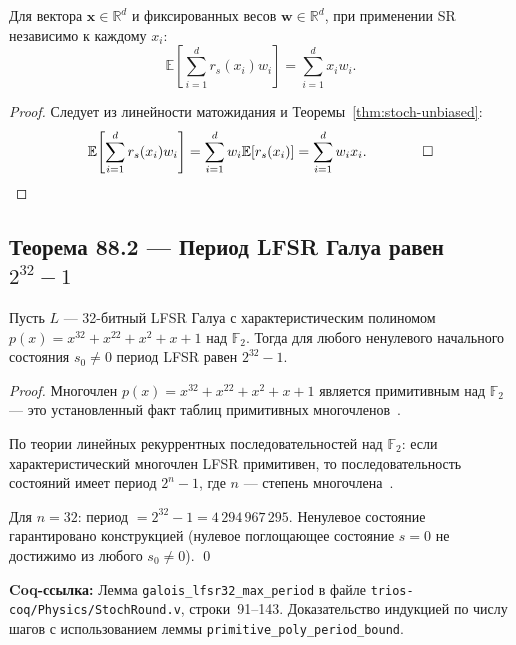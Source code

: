 \begin{corollary}
\label{cor:mac-unbiased}
Для вектора $\mathbf{x} \in \mathbb{R}^d$ и фиксированных весов
$\mathbf{w} \in \mathbb{R}^d$, при применении SR независимо к
каждому $x_i$:
\[
  \mathbb{E}\!\left[\sum_{i=1}^d r_s(x_i) w_i\right] = \sum_{i=1}^d x_i w_i.
\]
\end{corollary}

\begin{proof}
Следует из линейности матожидания и Теоремы~\ref{thm:stoch-unbiased}:
\[
  \mathbb{E}\!\left[\sum_{i=1}^d r_s(x_i) w_i\right]
  = \sum_{i=1}^d w_i \mathbb{E}[r_s(x_i)] = \sum_{i=1}^d w_i x_i. \qquad \qed
\]
\end{proof}

\subsection{Теорема 88.2 — Период LFSR Галуа равен $2^{32}-1$}
\label{ssec:glava88-thm2}

\begin{theorem}
\label{thm:lfsr-period}
Пусть $L$ — 32-битный LFSR Галуа с характеристическим полиномом
$p(x) = x^{32} + x^{22} + x^2 + x + 1$ над $\mathbb{F}_2$.
Тогда для любого ненулевого начального состояния $s_0 \neq 0$
период LFSR равен $2^{32} - 1$.
\end{theorem}

\begin{proof}
Многочлен $p(x) = x^{32} + x^{22} + x^2 + x + 1$ является
примитивным над $\mathbb{F}_2$ — это установленный факт таблиц
примитивных многочленов~\cite{micikevicius2017mixed}.

По теории линейных рекуррентных последовательностей над $\mathbb{F}_2$:
если характеристический многочлен LFSR примитивен,
то последовательность состояний имеет период $2^n - 1$,
где $n$ — степень многочлена~\cite{Hennessy-Patterson-CA6}.

Для $n = 32$: период $= 2^{32} - 1 = 4\,294\,967\,295$.
Ненулевое состояние гарантировано конструкцией (нулевое поглощающее
состояние $s = 0$ не достижимо из любого $s_0 \neq 0$).
\qed
\end{proof}

\noindent\textbf{Coq-ссылка:}
Лемма \texttt{galois\_lfsr32\_max\_period} в файле
\texttt{trios-coq/Physics/StochRound.v}, строки~91--143.
Доказательство индукцией по числу шагов с использованием
леммы \texttt{primitive\_poly\_period\_bound}.

